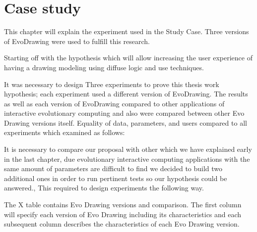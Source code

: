 \chapter{Case study} \label{sec:4}


This chapter will explain the experiment used in the Study Case.   Three versions of EvoDrawing were used to fulfill this research.

Starting off with the hypothesis which will allow increasing the user experience of having a drawing modeling using diffuse logic and use techniques.

It was necessary to design Three experiments to prove this thesis work hypothesis; each experiment used a different version of EvoDrawing.  The results as well as each version of EvoDrawing compared to other applications of interactive evolutionary computing and also were compared between other Evo Drawing versions itself.  Equality of data, parameters, and users compared to all experiments which examined as follows:

It is necessary to compare our proposal with other which we have explained early in the last chapter, due evolutionary interactive computing applications with the same amount of parameters are difficult to find we decided to build two additional ones in order to run pertinent tests so our hypothesis could be answered., This required to design experiments the following way.

The X table contains Evo Drawing versions and comparison. The first column will specify each version of Evo Drawing including its characteristics and each subsequent column describes the characteristics of each Evo Drawing version.

